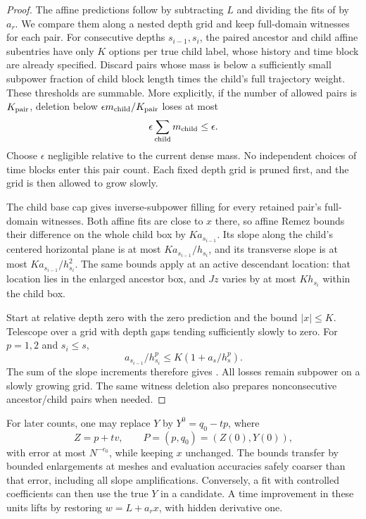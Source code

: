 \begin{proof}
The affine predictions follow by subtracting \(L\) and dividing
the fits of  by \(a_r\).
We compare them along a nested depth grid and keep full-domain
witnesses for each pair.  For consecutive depths \(s_{i-1},s_i\),
the paired ancestor and child affine subentries have only \(K\)
options per true child label, whose history and time block are
already specified.  Discard pairs whose mass is below a
sufficiently small subpower fraction of child block length times
the child's full trajectory weight.  These thresholds are
summable.  More explicitly, if the number of allowed pairs is
\(K_{\rm pair}\), deletion below
\(\epsilon m_{\rm child}/K_{\rm pair}\) loses at most
\[
 \epsilon\sum_{\rm child}m_{\rm child}\le\epsilon.
\]
Choose \(\epsilon\) negligible relative to the current dense
mass.  No independent choices of time blocks enter this pair
count.  Each fixed depth grid is pruned first, and the grid is
then allowed to grow slowly.

The child base cap gives inverse-subpower filling for every
retained pair's full-domain witnesses.  Both affine fits are close
to \(x\) there, so affine Remez bounds their difference on the
whole child box by \(Ka_{s_{i-1}}\).  Its slope along the child's
centered horizontal plane is at most
\(Ka_{s_{i-1}}/h_{s_i}\), and its transverse slope is at most
\(Ka_{s_{i-1}}/h_{s_i}^2\).  The same bounds apply at an active
descendant location: that location lies in the enlarged ancestor
box, and \(Jz\) varies by at most \(Kh_{s_i}\) within the
child box.

Start at relative depth zero with the zero prediction and the
bound \(|x|\le K\).  Telescope over a grid with depth gaps
tending sufficiently slowly to zero.  For \(p=1,2\) and
\(s_i\le s\),
\[
 a_{s_{i-1}}/h_{s_i}^{p}
     \le K(1+a_s/h_s^{p}).
\]
The sum of the slope increments therefore gives
.  All losses remain subpower on a
slowly growing grid.  The same witness deletion also prepares
nonconsecutive ancestor/child pairs when needed.
\end{proof}

For later counts, one may replace \(Y\) by
\(Y^0=q_0-tp\), where
\[
 Z=p+tv,\qquad P=(p,q_0)=(Z(0),Y(0)),
\]
with error at most \(N^{-e_0}\), while keeping \(x\) unchanged.
The bounds transfer by bounded enlargements at meshes and
evaluation accuracies safely coarser than that error, including
all slope amplifications.  Conversely, a fit with controlled
coefficients can then use the true \(Y\) in a candidate.
A time improvement in these units lifts by restoring
\(w=L+a_rx\), with hidden derivative one.

